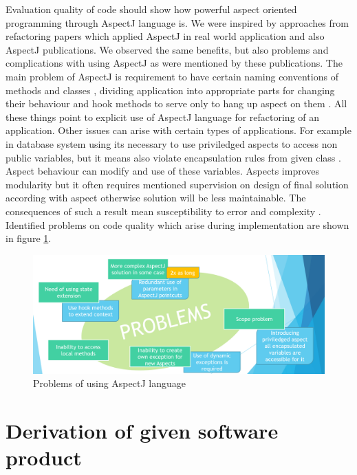 \documentclass[11pt,english,a4paper,twoside]{article}
\begin{document}
Evaluation quality of code should show how powerful aspect oriented programming through AspectJ language is. We were inspired by approaches from refactoring papers which applied AspectJ in real world application and also AspectJ publications. We observed the same benefits, but also problems and complications with using AspectJ as were mentioned by these publications. The main problem of AspectJ is requirement to have certain naming conventions of methods and classes \cite{laddad_aspectj_2003}, dividing application into appropriate parts for changing their behaviour and hook methods to serve only to hang up aspect on them \cite{kastner_case_2007}. All these things point to explicit use of AspectJ language for refactoring of an application. Other issues can arise with certain types  of applications. For example in database system using its necessary to use priviledged aspects to access non public variables, but it means also violate encapsulation rules from given class \cite{kastner_case_2007}. Aspect behaviour can modify and use of these variables. Aspects improves modularity but it often requires mentioned supervision on design of final solution according with aspect otherwise solution will be less maintainable. The consequences of such a result mean susceptibility to error and complexity \cite{EAOR_yokomori_2011}. Identified problems on code quality which arise during implementation are shown in figure \ref{problemsOfAspectJ}.


\begin{figure}[H]  %
					\begin{center}
									\includegraphics[width=\linewidth]{fig/problemsOfAspectJEN.png}
									\caption{Problems of using AspectJ language}
									\label{problemsOfAspectJ}
					\end{center}
\end{figure}



\section{Derivation of given software product} \label{gameDerivation}
\end{document}
